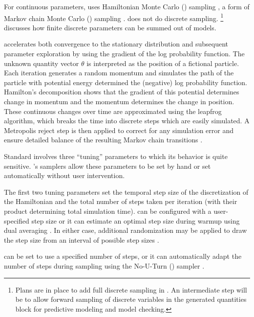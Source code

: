 For continuous parameters, \Stan uses Hamiltonian Monte Carlo (\HMC)
sampling \citep{Duane:1987, Neal:1994, Neal:2011}, a form of Markov chain Monte
Carlo (\MCMC) sampling \citep{Metropolis:1953}.   does not do
discrete sampling.%
%
\footnote{Plans are in place to add full discrete sampling in .  An intermediate step will be to allow forward sampling of
  discrete variables in the generated quantities block for predictive
  modeling and model checking.}
%
 discusses how finite discrete parameters
can be summed out of models.

\HMC accelerates both convergence to the stationary distribution and
subsequent parameter exploration by using the gradient of the log
probability function.  The unknown quantity vector $\theta$ is
interpreted as the position of a fictional particle.  Each iteration
generates a random momentum and simulates the path of the particle
with potential energy determined the (negative) log probability
function.  Hamilton's decomposition shows that the gradient of this
potential determines change in momentum and the momentum determines
the change in position.  These continuous changes over time are
approximated using the leapfrog algorithm, which breaks the time into
discrete steps which are easily simulated.  A Metropolis reject step
is then applied to correct for any simulation error and ensure
detailed balance of the resulting Markov chain transitions
\citep{Metropolis:1953, Hastings:1970}.

Standard \HMC involves three ``tuning'' parameters to which its
behavior is quite sensitive.  \Stan's samplers allow these parameters
to be set by hand or set automatically without user intervention.

The first two tuning parameters set the temporal step size of the
discretization of the Hamiltonian and the total number of steps taken
per iteration (with their product determining total simulation time).
\Stan can be configured with a user-specified step size or it can
estimate an optimal step size during warmup using dual averaging
\citep{Nesterov:2009, Hoffman-Gelman:2011, Hoffman-Gelman:2014}.  
In either case, additional randomization may be applied to draw the 
step size from an interval of possible step sizes \citep{Neal:2011}.

\Stan can be set to use a specified number of steps, or it can
automatically adapt the number of steps during sampling using the
No-U-Turn (\NUTS) sampler 
\citep{Hoffman-Gelman:2011, Hoffman-Gelman:2014}.  

